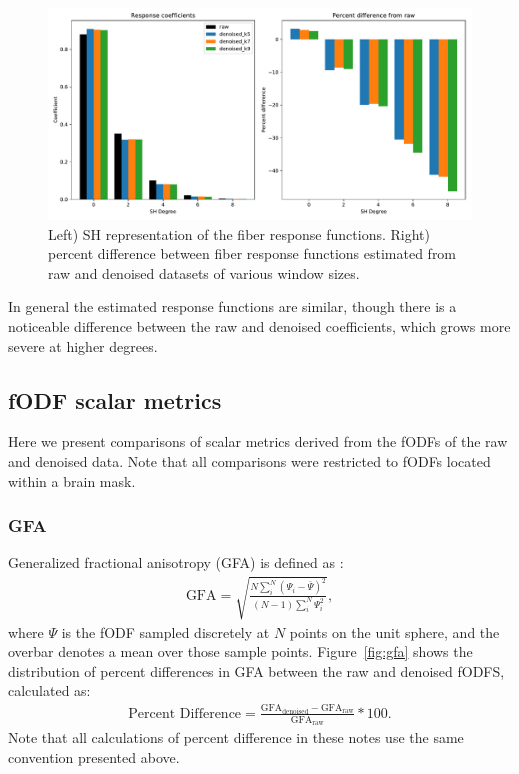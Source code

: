 \documentclass{article}
\begin{document}
\begin{figure}[h]
  \centering
  \includegraphics[width=0.8\linewidth]{../figs/response_SH}
  \captionsetup{width=0.8\linewidth}
  \caption{Left) SH representation of the fiber response functions. Right)
    percent difference between fiber response functions estimated from raw and
    denoised datasets of various window sizes.}
  \label{fig:response_sh}
\end{figure}

In general the estimated response functions are similar, though there is a
noticeable difference between the raw and denoised coefficients, which grows
more severe at higher degrees. 

\subsection{fODF scalar metrics}

Here we present comparisons of scalar metrics derived from the fODFs of the raw
and denoised data. Note that all comparisons were restricted to fODFs located
within a brain mask.

\subsubsection{GFA}
Generalized fractional anisotropy (GFA) is defined as \cite{Cohen-Adad2011}:
\begin{align}
  \text{GFA} = \sqrt{\frac{N \sum_i^N{(\Psi_i - \bar{\Psi})^2}}{(N-1) \sum_i^N{\Psi_i ^ 2}}},
\end{align}
where $\Psi$ is the fODF sampled discretely at $N$ points on the unit sphere,
and the overbar denotes a mean over those sample points. Figure~\ref{fig:gfa}
shows the distribution of percent differences in GFA between the raw and
denoised fODFS, calculated as:
\begin{align}
  \text{Percent Difference} = \frac{\text{GFA}_{\text{denoised}} - \text{GFA}_{\text{raw}}}{\text{GFA}_{\text{raw}}} * 100.
\end{align}
Note that all calculations of percent difference in these notes use the same
convention presented above.
\end{document}
